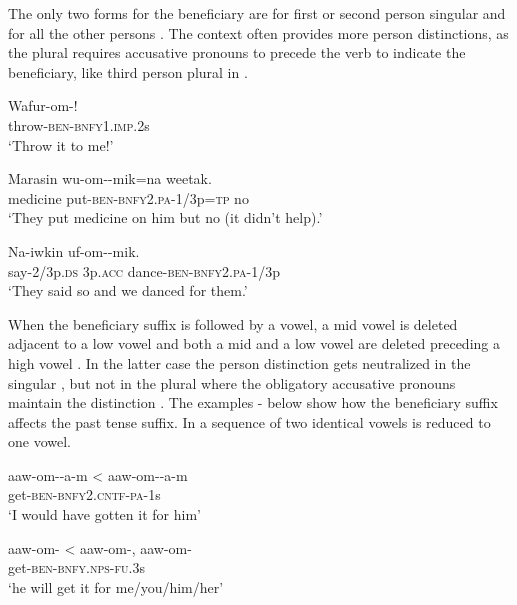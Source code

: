 The only two forms for the beneficiary are \textstyleEmphasizedVernacularWords{\nobreakdash-} for first or second person singular  and \textstyleEmphasizedVernacularWords{\nobreakdash-} for all the other persons . The context often provides more person distinctions, as the plural requires accusative pronouns to precede the verb to indicate the beneficiary, like third person plural in . 

\ea%
\label{ex:3:x225}
\gll Wafur-om-! \\
throw-\textsc{ben}-\textsc{bnfy}1.\textsc{imp}.2s \\
\glt`Throw it to me!' 
\z

\ea%
\label{ex:3:x226}
\gll Marasin wu-om--mik=na weetak. \\
medicine put-\textsc{ben}-\textsc{bnfy}2.\textsc{pa}-1/3p=\textsc{tp} no \\
\glt`They put medicine on him but no (it didn't help).'
\z

\ea%
\label{ex:3:x227}
\gll Na-iwkin  uf-om--mik. \\
say-2/3p.\textsc{ds} 3p.\textsc{acc} dance-\textsc{ben}-\textsc{bnfy}2.\textsc{pa}-1/3p \\
\glt`They said so and we danced for them.'
\z

When the beneficiary suffix is followed by a vowel, a mid vowel is deleted adjacent to a low vowel  and both a mid and a low vowel are deleted preceding a high vowel . In the latter case the person distinction gets neutralized in the singular , but not in the plural where the obligatory accusative pronouns maintain the distinction . The examples - below show how the beneficiary suffix affects the past tense suffix. In  a sequence of two identical vowels is reduced to one vowel.

\ea%
\label{ex:3:x228}
\gll aaw-om--a-m {{\textless} aaw-om}--a-m \\
get-\textsc{ben}-\textsc{bnfy}2.\textsc{cntf}-\textsc{pa}-1s \\
\glt`I would have gotten it for him' 
\z

\ea%
\label{ex:3:x444}
\gll aaw-om- {{\textless} aaw-om-}, aaw-om- \\
get-\textsc{ben}-\textsc{bnfy}.\textsc{nps}-\textsc{fu}.3s\\
\glt`he will get it for me/you/him/her'
\z

